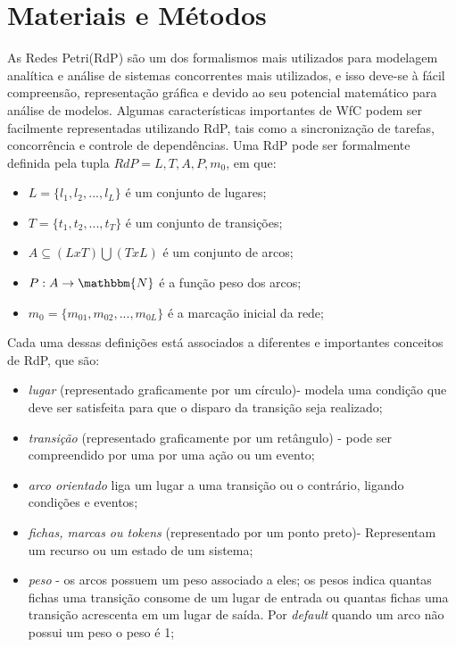 \documentclass[a4paper,10pt]{article}
\begin{document}
\section*{Materiais e Métodos}
	
	As Redes Petri(RdP) são um dos formalismos mais utilizados para modelagem analítica e análise de sistemas concorrentes mais utilizados, e isso deve-se à fácil compreensão, representação gráfica e devido ao seu potencial matemático para análise de modelos. Algumas características importantes de WfC podem ser facilmente representadas utilizando RdP, tais como a sincronização de tarefas, concorrência e controle de dependências\cite{Braghetto2011}.
	Uma RdP pode ser formalmente definida pela tupla $RdP={L,T,A,P,m_{0}}$, em que:

		\begin{itemize}
		\item $L=\{l_{1},l_{2},...,l_{L}\}$ é um conjunto de lugares;
		\item $T=\{t_{1},t_{2},...,t_{T}\}$ é um conjunto de transições;
		\item $A\subseteq(L x T)\bigcup (TxL)$ é um conjunto de arcos;
		\item $P:A\rightarrow\mathbbm{N}$ é a função peso dos arcos;
		\item $m_{0}=\{m_{01},m_{02},...,m_{0L}\}$ é a marcação inicial da rede;
		\end{itemize}

	Cada uma dessas definições está associados a diferentes e importantes conceitos de RdP, que são:
		
		\begin{itemize}
			
			\item \textit{lugar} (representado graficamente por um círculo)- modela uma condição que deve ser satisfeita para que o disparo da transição seja realizado;

			\item \textit{transição} (representado graficamente por um retângulo) - pode ser compreendido por uma por uma ação ou um evento;

			\item \textit{arco orientado} liga um lugar a uma transição ou o contrário, ligando condições e eventos;

			\item \textit{fichas, marcas ou tokens} (representado por um ponto preto)- Representam um recurso ou um estado de um sistema;

			\item \textit{peso} - os arcos possuem um peso associado a eles; os pesos indica quantas fichas uma transição consome de um lugar de entrada ou quantas fichas uma transição acrescenta em um lugar de saída. Por \textit{default} quando um arco não possui um peso o peso é 1;
					
			\end{itemize}
			
\end{document}
